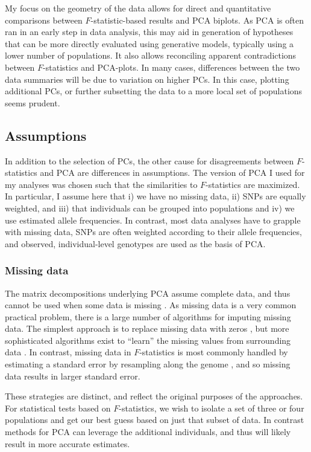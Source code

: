 \documentclass[12pt,fullpage, a4paper]{article}
\begin{document}
My focus on the geometry of the data allows for direct and quantitative comparisons between $F$-statistic-based results and PCA biplots. As PCA is often ran in an early step in data analysis, this may aid in generation of hypotheses that can be more directly evaluated using generative models, typically using a lower number of populations. It also allows reconciling apparent contradictions between $F$-statistics and PCA-plots. In many cases, differences between the two data summaries will be due to variation on higher PCs. In this case, plotting additional PCs, or further subsetting the data to a more local set of populations seems prudent. 

\subsection{Assumptions}
In addition to the selection of PCs, the other cause for disagreements between $F$-statistics and PCA are differences in assumptions. The version of PCA I used for my analyses was chosen such that the similarities to $F$-statistics are maximized. In particular, I assume here that i) we have no missing data, ii) SNPs are equally weighted, and iii) that individuals can be grouped into populations and iv) we use estimated allele frequencies. In contrast, most data analyses have to grapple with missing data, SNPs are often weighted according to their allele frequencies, and observed, individual-level genotypes are used as the basis of PCA.

\subsubsection{Missing data}
The matrix decompositions underlying PCA assume complete data, and thus cannot be used when some data is missing \citep{jollife2013}.  As missing data is a very common practical problem, there is a large number of algorithms for imputing missing data. The simplest approach is to replace missing data with zeros \citep[as implemented e.g. in][]{patterson2006}, but more sophisticated algorithms exist to ``learn'' the missing values from surrounding data \citep[e.g.][]{hastie2015, meisner2018, meisner2021}. In contrast, missing data in $F$-statistics is most commonly handled by estimating a standard error by resampling along the genome \citep{patterson2012}, and so missing data results in larger standard error. 

These strategies are distinct, and reflect the original purposes of the approaches. For statistical tests based on $F$-statistics, we wish to isolate a set of three or four populations and get our best guess based on just that subset of data. In contrast methods for PCA can leverage the additional individuals, and thus will likely result in more accurate estimates.
\end{document}
